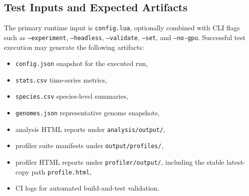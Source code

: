 \subsection{Test Inputs and Expected Artifacts}

The primary runtime input is \texttt{config.lua}, optionally combined with CLI flags such as
\texttt{--experiment}, \texttt{--headless}, \texttt{--validate}, \texttt{--set}, and
\texttt{--no-gpu}. Successful test execution may generate the following artifacts:

\begin{itemize}[nosep]
	\item \texttt{config.json} snapshot for the executed run,
	\item \texttt{stats.csv} time-series metrics,
	\item \texttt{species.csv} species-level summaries,
	\item \texttt{genomes.json} representative genome snapshots,
	\item analysis HTML reports under \texttt{analysis/output/},
	\item profiler suite manifests under \texttt{output/profiles/},
	\item profiler HTML reports under \texttt{profiler/output/}, including the stable
	      latest-copy path \texttt{profile.html},
	\item CI logs for automated build-and-test validation.
\end{itemize}
